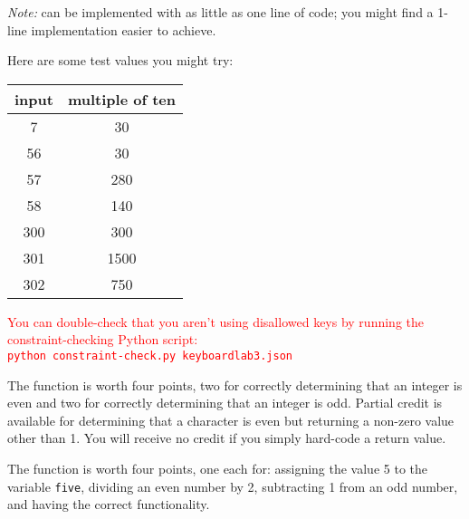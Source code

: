 \textit{Note: }  can be implemented with as little as one line of code;
you might find a 1-line implementation easier to achieve.

\begin{description}
\end{description}
Here are some test values you might try:

\begin{center}
    \begin{tabular}{cc}
        input   & multiple of ten \\ \hline
        7       & 30    \\
        56      & 30    \\
        57      & 280   \\
        58      & 140   \\
        300     & 300   \\
        301     & 1500  \\
        302     & 750   \\
    \end{tabular}
\end{center}

\textcolor{red}{
You can double-check that you aren't using disallowed keys by running the constraint-checking Python script: \\
\texttt{python constraint-check.py keyboardlab3.json}
}

The  function is worth four points, two for correctly determining that an integer is even and  two for correctly determining that an integer is odd.
Partial credit is available for determining that a character is even but returning a non-zero value other than 1.
You will receive no credit if you simply hard-code a return value.

The  function is worth four points, one each for: assigning the value 5 to the variable \lstinline{five}, dividing an even number by 2, subtracting 1 from an odd number, and having the correct functionality.
